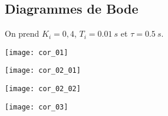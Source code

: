 \ifprof
\begin{corrige}

\end{corrige}
\else
\fi

\subsection*{Diagrammes de Bode}
On prend $K_i=0,4$, $T_i=\SI{0,01}{s}$ et $\tau =\SI{0,5}{s}$.
\\



\ifprof

\newpage


\begin{center}
\texttt{[image: cor\_01]}
\end{center}

\begin{center}
\texttt{[image: cor\_02\_01]}
\end{center}


\begin{center}
\texttt{[image: cor\_02\_02]}
\end{center}

\begin{center}
\texttt{[image: cor\_03]}
\end{center}

\else
\fi
